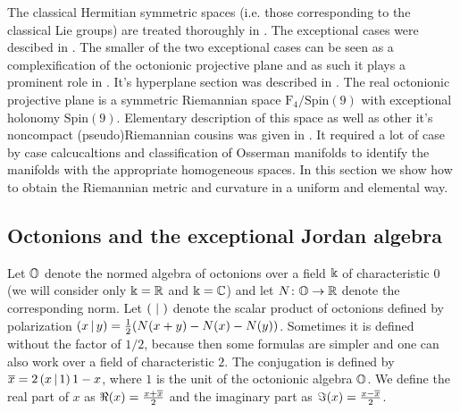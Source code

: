 The classical Hermitian symmetric spaces (i.e. those corresponding to the classical Lie groups) are treated thoroughly in \cite{faraut_analysis_1994}. The exceptional cases were descibed in \cite{drucker_exceptional_1978, drucker_simplified_1981}. The smaller of the two exceptional cases can be seen as a complexification of the octonionic projective plane \cite{landsberg} and as such it plays a prominent role in \cite{atiyah_projective_2003}. It's hyperplane section was described in \cite{pazourek}. The real octonionic projective plane is a symmetric Riemannian space $\mathrm{F_4}/\mathrm{Spin}(9)$ with exceptional holonomy $\mathrm{Spin}(9).$ Elementary description of this space as well as other it's noncompact (pseudo)Riemannian cousins was given in \cite{held_semi-riemannian_2009}. It required a lot of case by case calcucaltions and classification of Osserman manifolds to identify the manifolds with the appropriate homogeneous spaces. In this section we show how to obtain the Riemannian metric and curvature in a uniform and elemental way.

\subsection{Octonions and the exceptional Jordan algebra}

Let $\mathbb{O}$ denote the normed algebra of octonions over a field $\Bbbk$ of characteristic $0$ (we will consider only $\Bbbk=\mathbb{R}$ and $\Bbbk =\mathbb{C}$) and let $N\colon\mathbb{O} \to \mathbb{R}$ denote the corresponding norm. Let $\left( \, \,|\, \, \right)$ denote the scalar product of octonions  defined by polarization $\left( x \,|\, y \right) = \frac{1}{2} (N(x+y) - N(x) - N(y))$. Sometimes it is defined without the factor of $1/2$, because then some formulas are simpler and one can also work over a field of characteristic $2$. The conjugation is defined by $\overline{x} = 2\left( x \,|\, 1 \right)1 - x$, where $1$ is the unit of the octonionic algebra $\mathbb{O}$. We define the real part of $x$ as $\Re(x) = \frac{x + \overline{x}}{2}$ and the imaginary part as $\Im(x) = \frac{x-\overline{x}}{2}$. 

